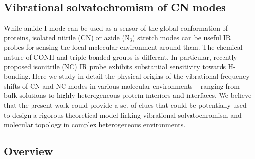 \documentclass[a4paper,titlepage,twoside,fleqn,12pt]{book}
\begin{document}

\begin{refsection}

\chapter{Vibrational solvatochromism of CN modes}

While amide I mode can be used as a sensor of the global conformation
of proteins, isolated nitrile (CN) or azide (N$_3$) 
stretch modes can be useful IR probes for sensing the local molecular environment
around them. The chemical nature of CONH and triple bonded groups
is different. In particular, recently proposed isonitrile (NC) 
IR probe exhibits substantial sensitivity towards H-bonding.
Here we study in detail the physical origins
of the vibrational frequency shifts of CN and NC modes
in various molecular environments -- ranging from bulk solutions
to highly heterogeneous protein interiors and interfaces.
We believe that the present work could provide a set of clues 
that could be potentially used to design a rigorous
theoretical model linking vibrational solvatochromism 
and molecular topology in complex heterogeneous environments.

\section{Overview}


\end{refsection}
\end{document}
